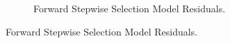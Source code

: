 \begin{figure}[h]
\begin{subfigure}{.6\textwidth}
		\caption{Forward Stepwise Selection Model Residuals.}
		\label{fig:ForwardFinalModelResidualsDist}
	\end{subfigure}
\end{figure}

